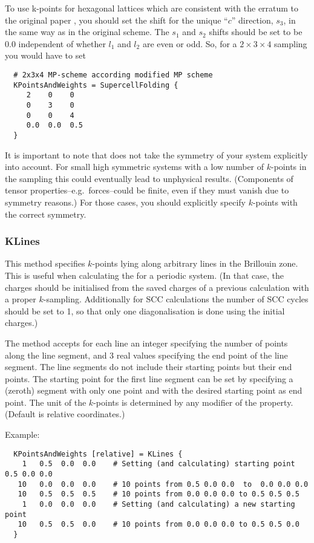 To use k-points for hexagonal lattices which are consistent with the
erratum to the original paper \cite{monkhorst-prb-16-1748}, you should
set the shift for the unique ``$c$'' direction, $s_3$, in the same way
as in the original scheme. The $s_1$ and $s_2$ shifts should be set to
be $0.0$ independent of whether $l_1$ and $l_2$ are even or odd.  So,
for a $2\times3\times4$ sampling you would have to set
\begin{verbatim}
  # 2x3x4 MP-scheme according modified MP scheme
  KPointsAndWeights = SupercellFolding {
     2    0    0
     0    3    0
     0    0    4
     0.0  0.0  0.5
  }
\end{verbatim}

It is important to note that \dftbp{} does not take the symmetry of
your system explicitly into account. For small high symmetric systems
with a low number of $k$-points in the sampling this could eventually
lead to unphysical results. (Components of tensor
properties--e.g.\ forces--could be finite, even if they must vanish
due to symmetry reasons.) For those cases, you should explicitly
specify $k$-points with the correct symmetry.


\subsubsection{KLines\cb}
\label{sec:dftbp.KLines}

This method specifies $k$-points lying along arbitrary lines in the
Brillouin zone. This is useful when calculating the  for a periodic system. (In
that case, the charges should be initialised from the saved charges of
a previous calculation with a proper $k$-sampling. Additionally for
SCC calculations the number of SCC cycles should be set to 1, so that
only one diagonalisation is done using the initial charges.)

The  method accepts for each line an integer specifying
the number of points along the line segment, and 3 real values
specifying the end point of the line segment. The line segments do not
include their starting points but their end points. The starting point
for the first line segment can be set by specifying a (zeroth) segment
with only one point and with the desired starting point as end point.
The unit of the $k$-points is determined by any modifier of the
 property. (Default is relative coordinates.)

Example:
\invparskip
\begin{verbatim}
  KPointsAndWeights [relative] = KLines {
    1   0.5  0.0  0.0    # Setting (and calculating) starting point 0.5 0.0 0.0
   10   0.0  0.0  0.0    # 10 points from 0.5 0.0 0.0  to  0.0 0.0 0.0
   10   0.5  0.5  0.5    # 10 points from 0.0 0.0 0.0 to 0.5 0.5 0.5
    1   0.0  0.0  0.0    # Setting (and calculating) a new starting point
   10   0.5  0.5  0.0    # 10 points from 0.0 0.0 0.0 to 0.5 0.5 0.0
  }
\end{verbatim}

